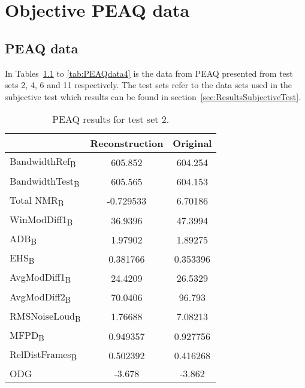 \chapter{Objective PEAQ data}\label{ap:PEAQdata}
\section{PEAQ data}
In Tables~\ref{tab:PEAQdata3} to \ref{tab:PEAQdata4} is the data from PEAQ\cite{BS-1387-1998} presented from test sets 2, 4, 6 and 11 respectively. The test sets refer to the data sets used in the subjective test which results can be found in section~\ref{sec:ResultsSubjectiveTest}.

\begin{table}\begin{center} %
\caption{PEAQ results for test set 2.}
\label{tab:PEAQdata3}
\begin{tabular}{|l|c|c|}
  \hline
                                    & Reconstruction & Original \\ \hline
  BandwidthRef\textsubscript{B}     & 605.852        & 604.254\\
  BandwidthTest\textsubscript{B}    & 605.565        & 604.153\\
  Total NMR\textsubscript{B}        & -0.729533      & 6.70186\\
  WinModDiff1\textsubscript{B}      & 36.9396        & 47.3994\\
  ADB\textsubscript{B}              & 1.97902        & 1.89275\\
  EHS\textsubscript{B}              & 0.381766       & 0.353396\\
  AvgModDiff1\textsubscript{B}      & 24.4209        & 26.5329\\
  AvgModDiff2\textsubscript{B}      & 70.0406        & 96.793\\
  RMSNoiseLoud\textsubscript{B}     & 1.76688        & 7.08213\\
  MFPD\textsubscript{B}             & 0.949357       & 0.927756\\
  RelDistFrames\textsubscript{B}    & 0.502392       & 0.416268\\
  ODG                               & -3.678         & -3.862\\
  \hline
\end{tabular}
\end{center}\end{table}


